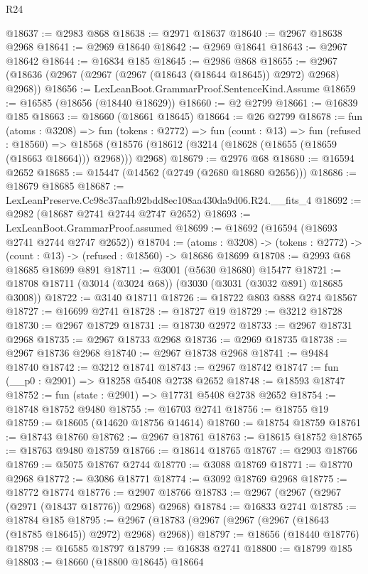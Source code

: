 \begin{lexlean}{R24}
\begin{coremodule}
@18637 := @2983 @868
@18638 := @2971 @18637
@18640 := @2967 @18638 @2968
@18641 := @2969 @18640
@18642 := @2969 @18641
@18643 := @2967 @18642
@18644 := @16834 @185
@18645 := @2986 @868
@18655 := @2967 (@18636 (@2967 (@2967 (@2967 (@18643 (@18644 @18645)) @2972) @2968) @2968))
@18656 := LexLeanBoot.GrammarProof.SentenceKind.Assume
@18659 := @16585 (@18656 (@18440 @18629))
@18660 := @2 @2799
@18661 := @16839 @185
@18663 := @18660 (@18661 @18645)
@18664 := @26 @2799
@18678 := fun (atoms : @3208) =>
  fun (tokens : @2772) =>
  fun (count : @13) =>
  fun (refused : @18560) =>
  @18568 (@18576 (@18612 (@3214 (@18628 (@18655 (@18659 (@18663 @18664))) @2968))) @2968)
@18679 := @2976 @68
@18680 := @16594 @2652
@18685 := @15447 (@14562 (@2749 (@2680 @18680 @2656)))
@18686 := @18679 @18685
@18687 := LexLeanPreserve.Cc98c37aafb92bdd8ec108aa430da9d06.R24.__fits_4
@18692 := @2982 (@18687 @2741 @2744 @2747 @2652)
@18693 := LexLeanBoot.GrammarProof.assumed
@18699 := @18692 (@16594 (@18693 @2741 @2744 @2747 @2652))
@18704 := (atoms : @3208) ->
  (tokens : @2772) -> (count : @13) -> (refused : @18560) -> @18686 @18699
@18708 := @2993 @68 @18685 @18699 @891
@18711 := @3001 (@5630 @18680) @15477
@18721 := @18708 @18711 (@3014 (@3024 @68)) (@3030 (@3031 (@3032 @891) @18685 @3008))
@18722 := @3140 @18711
@18726 := @18722 @803 @888 @274 @18567
@18727 := @16699 @2741
@18728 := @18727 @19
@18729 := @3212 @18728
@18730 := @2967 @18729
@18731 := @18730 @2972
@18733 := @2967 @18731 @2968
@18735 := @2967 @18733 @2968
@18736 := @2969 @18735
@18738 := @2967 @18736 @2968
@18740 := @2967 @18738 @2968
@18741 := @9484 @18740
@18742 := @3212 @18741
@18743 := @2967 @18742
@18747 := fun (__p0 : @2901) => @18258 @5408 @2738 @2652
@18748 := @18593 @18747
@18752 := fun (state : @2901) => @17731 @5408 @2738 @2652
@18754 := @18748 @18752 @9480
@18755 := @16703 @2741
@18756 := @18755 @19
@18759 := @18605 (@14620 @18756 @14614)
@18760 := @18754 @18759
@18761 := @18743 @18760
@18762 := @2967 @18761
@18763 := @18615 @18752
@18765 := @18763 @9480 @18759
@18766 := @18614 @18765
@18767 := @2903 @18766
@18769 := @5075 @18767 @2744
@18770 := @3088 @18769
@18771 := @18770 @2968
@18772 := @3086 @18771
@18774 := @3092 @18769 @2968
@18775 := @18772 @18774
@18776 := @2907 @18766
@18783 := @2967 (@2967 (@2967 (@2971 (@18437 @18776)) @2968) @2968)
@18784 := @16833 @2741
@18785 := @18784 @185
@18795 := @2967 (@18783 (@2967 (@2967 (@2967 (@18643 (@18785 @18645)) @2972) @2968) @2968))
@18797 := @18656 (@18440 @18776)
@18798 := @16585 @18797
@18799 := @16838 @2741
@18800 := @18799 @185
@18803 := @18660 (@18800 @18645) @18664

\end{coremodule}
\end{lexlean}
